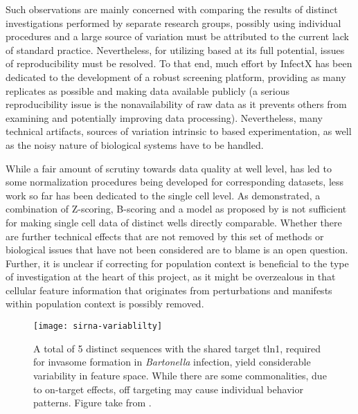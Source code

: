 Such observations are mainly concerned with comparing the results of distinct investigations performed by separate research groups, possibly using individual procedures and a large source of variation must be attributed to the current lack of standard practice. Nevertheless, for utilizing  based  at its full potential, issues of reproducibility must be resolved. To that end, much effort by InfectX has been dedicated to the development of a robust screening platform, providing as many replicates as possible and making data available publicly (a serious reproducibility issue is the nonavailability of raw data as it prevents others from examining and potentially improving data processing). Nevertheless, many technical artifacts, sources of variation intrinsic to  based experimentation, as well as the noisy nature of biological systems have to be handled.

While a fair amount of scrutiny towards data quality at well level, has led to some normalization procedures being developed for corresponding datasets, less work so far has been dedicated to the single cell level. As demonstrated, a combination of Z-scoring, B-scoring and a  model as proposed by \citet{Knapp2011} is not sufficient for making single cell data of distinct wells directly comparable. Whether there are further technical effects that are not removed by this set of methods or biological issues that have not been considered are to blame is an open question. Further, it is unclear if correcting for population context is beneficial to the type of investigation at the heart of this project, as it might be overzealous in that cellular feature information that originates from  perturbations and manifests within population context is possibly removed.

\begin{figure}
  \centering
  \texttt{[image: sirna-variablilty]}
  \caption[Feature space variability of different  sequences sharing the same target gene.]{A total of 5 distinct  sequences with the shared target \acrfull{tln1}, required for invasome formation in \textit{Bartonella} infection, yield considerable variability in feature space. While there are some commonalities, due to on-target effects, off targeting may cause individual behavior patterns. Figure take from \citet{Geier2010}.}
  \label{fig:sirna-variablilty}
\end{figure}

